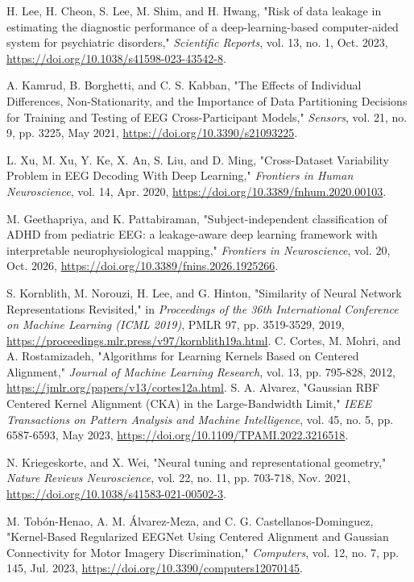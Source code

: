  H. Lee, H. Cheon, S. Lee, M. Shim, and H. Hwang, "Risk of data leakage in estimating the diagnostic performance of a deep-learning-based computer-aided system for psychiatric disorders," \textit{Scientific Reports}, vol. 13, no. 1, Oct. 2023, \url{https://doi.org/10.1038/s41598-023-43542-8}.

 A. Kamrud, B. Borghetti, and C. S. Kabban, "The Effects of Individual Differences, Non-Stationarity, and the Importance of Data Partitioning Decisions for Training and Testing of EEG Cross-Participant Models," \textit{Sensors}, vol. 21, no. 9, pp. 3225, May 2021, \url{https://doi.org/10.3390/s21093225}.

 L. Xu, M. Xu, Y. Ke, X. An, S. Liu, and D. Ming, "Cross-Dataset Variability Problem in EEG Decoding With Deep Learning," \textit{Frontiers in Human Neuroscience}, vol. 14, Apr. 2020, \url{https://doi.org/10.3389/fnhum.2020.00103}.

 M. Geethapriya, and K. Pattabiraman, "Subject-independent classification of ADHD from pediatric EEG: a leakage-aware deep learning framework with interpretable neurophysiological mapping," \textit{Frontiers in Neuroscience}, vol. 20, Oct. 2026, \url{https://doi.org/10.3389/fnins.2026.1925266}.

 S. Kornblith, M. Norouzi, H. Lee, and G. Hinton, "Similarity of Neural Network Representations Revisited," in \textit{Proceedings of the 36th International Conference on Machine Learning (ICML 2019)}, PMLR 97, pp. 3519-3529, 2019, \url{https://proceedings.mlr.press/v97/kornblith19a.html}.
 C. Cortes, M. Mohri, and A. Rostamizadeh, "Algorithms for Learning Kernels Based on Centered Alignment," \textit{Journal of Machine Learning Research}, vol. 13, pp. 795-828, 2012, \url{https://jmlr.org/papers/v13/cortes12a.html}.
 S. A. Alvarez, "Gaussian RBF Centered Kernel Alignment (CKA) in the Large-Bandwidth Limit," \textit{IEEE Transactions on Pattern Analysis and Machine Intelligence}, vol. 45, no. 5, pp. 6587-6593, May 2023, \url{https://doi.org/10.1109/TPAMI.2022.3216518}.

 N. Kriegeskorte, and X. Wei, "Neural tuning and representational geometry," \textit{Nature Reviews Neuroscience}, vol. 22, no. 11, pp. 703-718, Nov. 2021, \url{https://doi.org/10.1038/s41583-021-00502-3}.

 M. Tobón-Henao, A. M. Álvarez-Meza, and C. G. Castellanos-Dominguez, "Kernel-Based Regularized EEGNet Using Centered Alignment and Gaussian Connectivity for Motor Imagery Discrimination," \textit{Computers}, vol. 12, no. 7, pp. 145, Jul. 2023, \url{https://doi.org/10.3390/computers12070145}.

